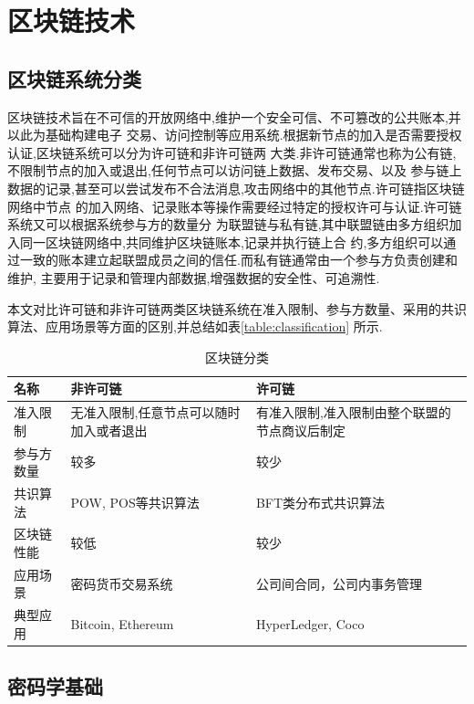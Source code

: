 
\chapter{区块链技术}

\section{区块链系统分类}

区块链技术旨在不可信的开放网络中,维护一个安全可信、不可篡改的公共账本,并以此为基础构建电子 交易、访问控制等应用系统.根据新节点的加入是否需要授权认证,区块链系统可以分为许可链和非许可链两 大类.非许可链通常也称为公有链,不限制节点的加入或退出,任何节点可以访问链上数据、发布交易、以及 参与链上数据的记录,甚至可以尝试发布不合法消息,攻击网络中的其他节点.许可链指区块链网络中节点 的加入网络、记录账本等操作需要经过特定的授权许可与认证.许可链系统又可以根据系统参与方的数量分 为联盟链与私有链,其中联盟链由多方组织加入同一区块链网络中,共同维护区块链账本,记录并执行链上合 约,多方组织可以通过一致的账本建立起联盟成员之间的信任.而私有链通常由一个参与方负责创建和维护, 主要用于记录和管理内部数据,增强数据的安全性、可追溯性. 

本文对比许可链和非许可链两类区块链系统在准入限制、参与方数量、采用的共识算法、应用场景等方面的区别,并总结如表\ref{table:classification} 所示. 

\begin{table}  
\caption{区块链分类}  
\begin{tabularx}{15cm}{X|X|X}
\hline  
名称 & 非许可链 & 许可链 \\ \hline 

准入限制  & 无准入限制,任意节点可以随时加入或者退出 & 有准入限制,准入限制由整个联盟的节点商议后制定 \\  
参与方数量  & 较多 & 较少 \\  
共识算法  & POW, POS等共识算法 & BFT类分布式共识算法 \\  
区块链性能  & 较低 & 较少 \\  
应用场景	 & 密码货币交易系统 & 公司间合同，公司内事务管理 \\  
典型应用  & Bitcoin, Ethereum & HyperLedger, Coco \\ \hline  
\end{tabularx}
\end{table}

\section{密码学基础}

